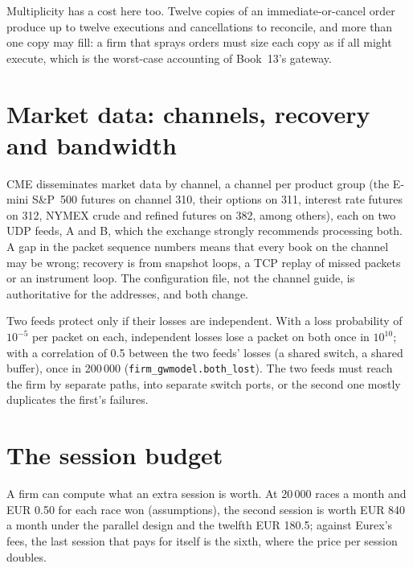 Multiplicity has a cost here too. Twelve copies of an immediate-or-cancel order produce up to twelve executions and cancellations
to reconcile, and more than one copy may fill: a firm that sprays orders must size each copy as if all might execute, which is
the worst-case accounting of Book~13's gateway.

\section{Market data: channels, recovery and bandwidth}

CME disseminates market data by channel, a channel per product group (the E-mini S\&P~500 futures on channel 310, their options
on 311, interest rate futures on 312, NYMEX crude and refined futures on 382, among others), each on two UDP feeds, A and B,
which the exchange strongly recommends processing both. A gap in the packet sequence numbers means that every book on the
channel may be wrong; recovery is from snapshot loops, a TCP replay of missed packets or an instrument loop. The configuration
file, not the channel guide, is authoritative for the addresses, and both change.

Two feeds protect only if their losses are independent. With a loss probability of $10^{-5}$ per packet on each, independent
losses lose a packet on both once in $10^{10}$; with a correlation of 0.5 between the two feeds' losses (a shared switch, a
shared buffer), once in 200\,000 (\texttt{firm\_gwmodel.both\_lost}). The two feeds must reach the firm by separate paths, into
separate switch ports, or the second one mostly duplicates the first's failures.

\section{The session budget}

A firm can compute what an extra session is worth. At 20\,000 races a month and EUR 0.50 for each race won (assumptions), the
second session is worth EUR 840 a month under the parallel design and the twelfth EUR 180.5; against Eurex's fees, the last
session that pays for itself is the sixth, where the price per session doubles.

\label{lst:nw:futures-connectivity:marginal}

